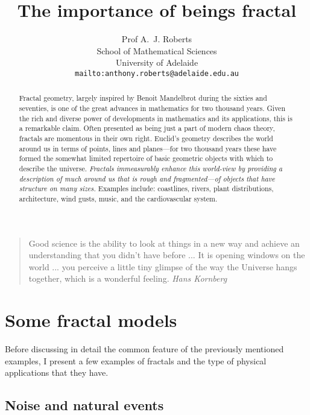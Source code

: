\documentclass[12pt,a5paper]{article}
\title{The importance of beings fractal}
\author{Prof A.~J. Roberts\\
School of Mathematical Sciences\\
University of Adelaide\\
\texttt{mailto:anthony.roberts@adelaide.edu.au}
}
\begin{document}
\maketitle


\begin{quote}
	Good science is the ability to look at things in a new way and 
	achieve an understanding that you didn't have before ... It is opening 
	windows on the world ... you perceive a little tiny glimpse of the way 
	the Universe hangs together, which is a wonderful feeling.  \emph{Hans 
	Kornberg}
\end{quote}

\begin{abstract}
	Fractal geometry, largely inspired by Benoit Mandelbrot during the 
	sixties and seventies, is one of the great advances in mathematics 
	for two thousand years.  Given the rich and diverse power of 
	developments in mathematics and its applications, this is a 
	remarkable claim.  Often presented as being just a part of modern 
	chaos theory, fractals are momentous in their own right.  Euclid's 
	geometry describes the world around us in terms of points, lines and 
	planes---for two thousand years these have formed the somewhat 
	limited repertoire of basic geometric objects with which to describe 
	the universe.  \emph{Fractals immeasurably enhance this world-view by 
	providing a description of much around us that is rough and 
	fragmented---of objects that have structure on many sizes.}  Examples 
	include: coastlines, rivers, plant distributions, architecture, wind 
	gusts, music, and the cardiovascular system.  
\end{abstract}

\section{Some fractal models}

Before discussing in detail the common feature of the previously 
mentioned examples, I present a few examples of fractals and the type 
of physical applications that they have.  

\subsection{Noise and natural events}
\end{document}
